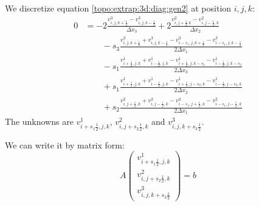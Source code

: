 We discretize equation \ref{topo:extrap:3d:diag:gen2} at position $i,j,k$:
\begin{equation}\label{extrap:3d:3:eq2}
\begin{split}
	0&=-2\frac{v^{3}_{i,j,k+\frac{1}{2}}-v^{3}_{i,j,k-\frac{1}{2}}}{\Delta x_3}+2\frac{v^{2}_{i,j+\frac{1}{2}.k}-v^{2}_{i,j-\frac{1}{2},k}}{\Delta x_2}\\
	&\qquad -s_3\frac{v^{3}_{i,j,k+\frac{1}{2}}+v^{3}_{i,j,k-\frac{1}{2}}-v^{3}_{i-s_1,j,k+\frac{1}{2}}-v^{3}_{i-s_1,j,k-\frac{1}{2}}}{2\Delta x_1}\\
	&\qquad -s_1\frac{v^{1}_{i+\frac{1}{2},j,k}+v^1_{i-\frac{1}{2},j,k}-v^{1}_{i+\frac{1}{2},j,k-s_3}-v^{1}_{i-\frac{1}{2},j,k-s_3}}{2\Delta x_3}\\
	&\qquad +s_1\frac{v^{1}_{i+\frac{1}{2},j,k}+v^{1}_{i-\frac{1}{2},j,k}-v^{1}_{i+\frac{1}{2},j-s_2,k}-v^{1}_{i-\frac{1}{2},j-s_2,k}}{2\Delta x_2}\\
	&\qquad +s_2\frac{v^{2}_{i,j+\frac{1}{2},k}+v^2_{i,j-\frac{1}{2},k}-v^{2}_{i-s_1,j+\frac{1}{2},k}-v^{2}_{i-s_1,j-\frac{1}{2},k}}{2\Delta x_1}
\end{split}
	\end{equation}
The unknowns are $v^{1}_{i+s_1\frac{1}{2},j,k}$, $v^2_{i,j+s_2\frac{1}{2},k}$ and $v^{3}_{i,j,k+s_3\frac{1}{2}}$.

We can write it by matrix form:
\begin{equation}
 A\begin{pmatrix}
   v^{1}_{i+s_1\frac{1}{2},j,k}\\
   v^2_{i,j+s_2\frac{1}{2},k}\\
   v^{3}_{i,j,k+s_3\frac{1}{2}}
  \end{pmatrix}=b
\end{equation}

